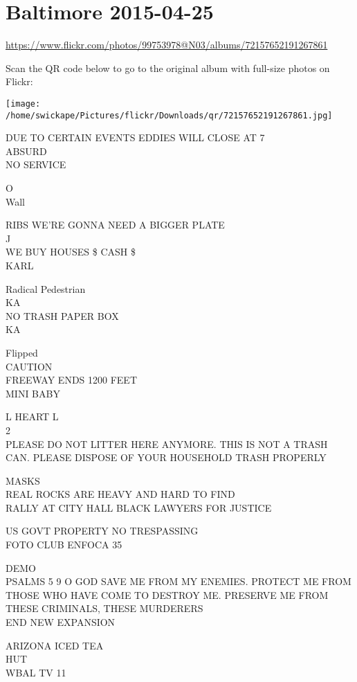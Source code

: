 \documentclass[10pt,letterpaper]{article}
\begin{document}
\section*{Baltimore 2015-04-25}

\url{https://www.flickr.com/photos/99753978@N03/albums/72157652191267861}

Scan the QR code below to go to the original album with full-size photos on Flickr:

\texttt{[image: /home/swickape/Pictures/flickr/Downloads/qr/72157652191267861.jpg]}
\pagebreak

DUE TO CERTAIN EVENTS EDDIES WILL CLOSE AT 7\\
ABSURD\\
NO SERVICE

O\\
Wall

RIBS WE'RE GONNA NEED A BIGGER PLATE\\
J\\
WE BUY HOUSES \$ CASH \$\\
KARL

Radical Pedestrian\\
KA\\
NO TRASH PAPER BOX\\
KA

Flipped\\
CAUTION\\
FREEWAY ENDS 1200 FEET\\
MINI BABY

L HEART L\\
2\\
PLEASE DO NOT LITTER HERE ANYMORE.  THIS IS NOT A TRASH CAN.  PLEASE DISPOSE OF YOUR HOUSEHOLD TRASH PROPERLY

MASKS\\
REAL ROCKS ARE HEAVY AND HARD TO FIND\\
RALLY AT CITY HALL BLACK LAWYERS FOR JUSTICE

US GOVT PROPERTY NO TRESPASSING\\
FOTO CLUB ENFOCA 35

DEMO\\
PSALMS 5 9 O GOD SAVE ME FROM MY ENEMIES.  PROTECT ME FROM THOSE WHO HAVE COME TO DESTROY ME.  PRESERVE ME FROM THESE CRIMINALS, THESE MURDERERS\\
END NEW EXPANSION

ARIZONA ICED TEA\\
HUT\\
WBAL TV 11
\end{document}
